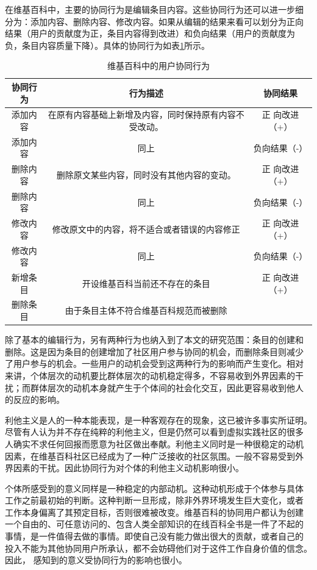 在维基百科中，主要的协同行为是编辑条目内容。这些协同行为还可以进一步细
分为：添加内容、删除内容、修改内容。如果从编辑的结果来看可以划分为正向
结果（用户的贡献度为正，条目内容得到改进）和负向结果（用户的贡献度为
负，条目内容质量下降）。具体的协同行为如表\ref{tab:collaboration-activities}所示。
\begin{table}[htb]
  \centering
 \small
  \caption{\small{维基百科中的用户协同行为}}
  \begin{tabular}{|c|c|c|}

\hline
    协同行为&行为描述&协同结果\\\hline
    添加内容&在原有内容基础上新增及内容，同时保持原有内容不受改动。&正
    向改进（+）\\\hline
    添加内容&同上&负向结果（-）\\\hline
    删除内容&删除原文某些内容，同时没有其他内容的变动。&正
    向改进（+）\\\hline
    删除内容&同上&负向结果（-）\\\hline
    修改内容&修改原文中的内容，将不适合或者错误的内容修正&正
    向改进（+）\\\hline
    修改内容&同上&负向结果（-）\\\hline
    新增条目&开设维基百科当前还不存在的条目&正
    向改进（+）\\\hline
    删除条目&由于条目主体不符合维基百科规范而被删除& \\\hline
  \end{tabular}

  \label{tab:collaboration-activities}
\end{table}

除了基本的编辑行为，另有两种行为也纳入到了本文的研究范围：条目的创建和
删除。这是因为条目的创建增加了社区用户参与协同的机会，而删除条目则减少
了用户参与的机会。一些用户的动机会受到这两种行为的影响而产生变化。相对
来讲，个体层次的动机要比群体层次的动机稳定得多，不容易收到外界因素的干
扰；而群体层次的动机本身就产生于个体间的社会化交互，因此更容易收到他人
的反应的影响。

利他主义是人的一种本能表现，是一种客观存在的现象，这已被许多事实所证明。
尽管有人认为并不存在纯粹的利他主义，但是仍然可以看到虚拟实践社区的很多
人确实不求任何回报而愿意为社区做出奉献。利他主义同时是一种很稳定的动机
因素，在维基百科社区已经成为了一种广泛接收的社区氛围。一般不容易受到外
界因素的干扰。因此协同行为对个体的利他主义动机影响很小。

个体所感受到的意义同样是一种稳定的内部动机。这种动机形成于个体参与具体
工作之前最初始的判断。这种判断一旦形成，除非外界环境发生巨大变化，或者
工作本身偏离了其预定目标，否则很难被改变。维基百科的协同用户都认为创建
一个自由的、可任意访问的、包含人类全部知识的在线百科全书是一件了不起的
事情，是一件值得去做的事情。即使自己没有能力做出很大的贡献，或者自己的
投入不能为其他协同用户所承认，都不会妨碍他们对于这件工作自身价值的信念。因此，
感知到的意义受协同行为的影响也很小。

